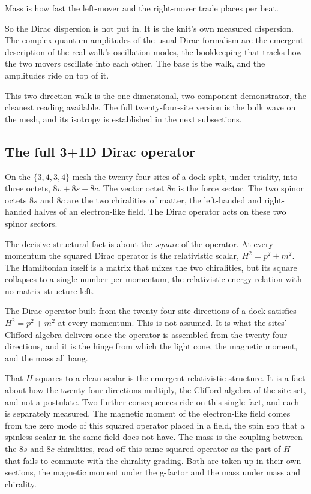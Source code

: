 \begin{principle}
Mass is how fast the left-mover and the right-mover trade places per beat.
\end{principle}

So the Dirac dispersion is not put in. It is the knit's own measured dispersion. The complex quantum amplitudes of
the usual Dirac formalism are the emergent description of the real walk's oscillation modes, the bookkeeping that
tracks how the two movers oscillate into each other. The base is the walk, and the amplitudes ride on top of it.

This two-direction walk is the one-dimensional, two-component demonstrator, the cleanest reading available. The full
twenty-four-site version is the bulk wave on the mesh, and its isotropy is established in the next subsections.

\subsection{The full 3+1D Dirac operator}

On the $\{3,4,3,4\}$ mesh the twenty-four sites of a dock split, under triality, into three octets, $8v + 8s + 8c$.
The vector octet $8v$ is the force sector. The two spinor octets $8s$ and $8c$ are the two chiralities of matter,
the left-handed and right-handed halves of an electron-like field. The Dirac operator acts on these two spinor
sectors.

The decisive structural fact is about the \emph{square} of the operator. At every momentum the squared Dirac
operator is the relativistic scalar, $H^2 = p^2 + m^2$. The Hamiltonian itself is a matrix that mixes the two
chiralities, but its square collapses to a single number per momentum, the relativistic energy relation with no
matrix structure left.

\begin{theorem}
The Dirac operator built from the twenty-four site directions of a dock satisfies $H^2 = p^2 + m^2$ at every
momentum. This is not assumed. It is what the sites' Clifford algebra delivers once the operator is assembled from
the twenty-four directions, and it is the hinge from which the light cone, the magnetic moment, and the mass all
hang.
\end{theorem}

That $H$ squares to a clean scalar is the emergent relativistic structure. It is a fact about how the twenty-four
directions multiply, the Clifford algebra of the site set, and not a postulate. Two further consequences ride on
this single fact, and each is separately measured. The magnetic moment of the electron-like field comes from the
zero mode of this squared operator placed in a field, the spin gap that a spinless scalar in the same field does
not have. The mass is the coupling between the $8s$ and $8c$ chiralities, read off this same squared operator as
the part of $H$ that fails to commute with the chirality grading. Both are taken up in their own sections, the
magnetic moment under the g-factor and the mass under mass and chirality.

